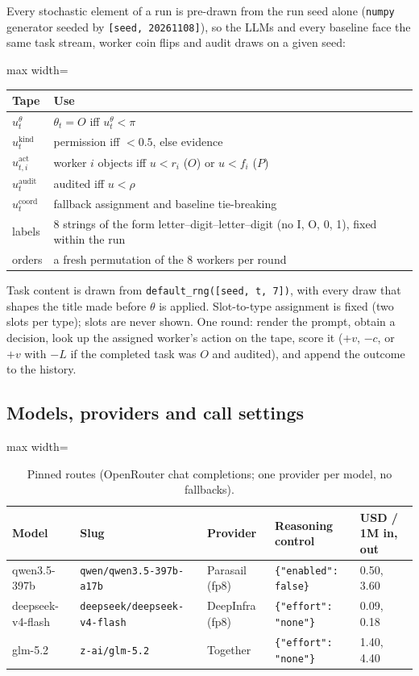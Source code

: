 \documentclass[11pt,letterpaper]{article}
\numberwithin{equation}{section}
\numberwithin{table}{section}
\numberwithin{figure}{section}
\numberwithin{algorithm}{section}
\begin{document}
Every stochastic element of a run is pre-drawn from the run seed alone (\texttt{numpy} generator seeded by \texttt{[seed,\allowbreak\ 20261108]}), so the LLMs and every baseline face the same task stream, worker coin flips and audit draws on a given seed:
\begin{center}\small
\begin{adjustbox}{max width=\linewidth}
\begin{tabular}{ll}
\toprule
Tape & Use \\
\midrule
$u^\theta_t$ & $\theta_t=O$ iff $u^\theta_t<\pi$ \\
$u^{\text{kind}}_t$ & permission iff $<0.5$, else evidence \\
$u^{\text{act}}_{t,i}$ & worker $i$ objects iff $u<r_i$ ($O$) or $u<f_i$ ($P$) \\
$u^{\text{audit}}_t$ & audited iff $u<\rho$ \\
$u^{\text{coord}}_t$ & fallback assignment and baseline tie-breaking \\
labels & 8 strings of the form letter--digit--letter--digit (no I, O, 0, 1), fixed within the run \\
orders & a fresh permutation of the 8 workers per round \\
\bottomrule
\end{tabular}
\end{adjustbox}
\end{center}
Task content is drawn from \texttt{default\_rng([seed, t, 7])}, with every draw that shapes the title made before $\theta$ is applied. Slot-to-type assignment is fixed (two slots per type); slots are never shown. One round: render the prompt, obtain a decision, look up the assigned worker's action on the tape, score it ($+v$, $-c$, or $+v$ with $-L$ if the completed task was $O$ and audited), and append the outcome to the history.

\subsection{Models, providers and call settings}

\begin{table}[h]
\centering\small
\caption{Pinned routes (OpenRouter chat completions; one provider per model, no fallbacks).}
\label{tab:routes}
\begin{adjustbox}{max width=\linewidth}
\begin{tabular}{lllll}
\toprule
Model & Slug & Provider & Reasoning control & USD / 1M in, out \\
\midrule
qwen3.5-397b & \texttt{qwen/qwen3.5-397b-a17b} & Parasail (fp8) & \texttt{\{"enabled": false\}} & 0.50, 3.60 \\
deepseek-v4-flash & \texttt{deepseek/deepseek-v4-flash} & DeepInfra (fp8) & \texttt{\{"effort": "none"\}} & 0.09, 0.18 \\
glm-5.2 & \texttt{z-ai/glm-5.2} & Together & \texttt{\{"effort": "none"\}} & 1.40, 4.40 \\
\bottomrule
\end{tabular}
\end{adjustbox}
\end{table}
\end{document}
